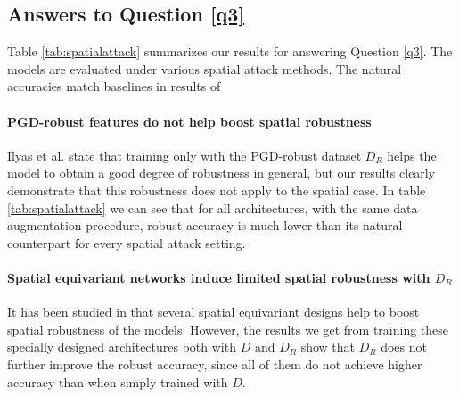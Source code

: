\subsection{Answers to Question \ref{q3}}
Table \ref{tab:spatialattack} summarizes our results for answering Question \ref{q3}. The models are evaluated under various spatial attack methods. The natural accuracies match baselines in results of \cite{Cohen16, Yang2019}

\paragraph{PGD-robust features do not help boost spatial robustness} Ilyas et al. state that training only with the PGD-robust dataset $D_R$ helps the model to obtain a good degree of robustness in general, but our results clearly demonstrate that this robustness does not apply to the spatial case. In table \ref{tab:spatialattack} we can see that for all architectures, with the same data augmentation procedure, robust accuracy is much lower than its natural counterpart for every spatial attack setting.  

\paragraph{Spatial equivariant networks induce limited spatial robustness with $D_R$} It has been studied in \cite{Yang2019} that several spatial equivariant designs help to boost spatial robustness of the models. However, the results we get from training these specially designed architectures both with $D$ and $D_R$ show that $D_R$ does not further improve the robust accuracy, since all of them do not achieve higher accuracy than when simply trained with $D$.



